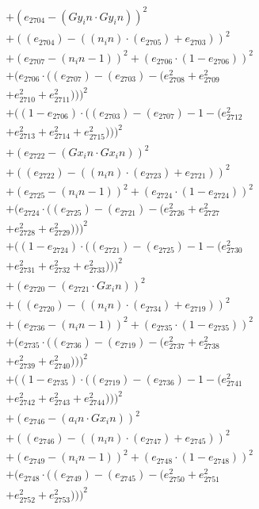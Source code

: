 \documentclass[10pt, a4paper]{article}
\begin{document}
\begin{small}
\begin{align*}
& + (e_{2704} - (Gy_in  \cdot  Gy_in))^{2} \\
& + ((e_{2704}) - ((n_in)  \cdot  (e_{2705}) + e_{2703}))^{2} \\
& + (e_{2707} - (n_in - 1))^{2} + (e_{2706}  \cdot  (1 - e_{2706}))^{2} \\
& + (e_{2706}  \cdot  ((e_{2707}) - (e_{2703}) - (e_{2708}^{2} + e_{2709}^{2} \\
& + e_{2710}^{2} + e_{2711}^{2})))^{2} \\
& + ((1 - e_{2706})  \cdot  ((e_{2703}) - (e_{2707}) - 1 - (e_{2712}^{2} \\
& + e_{2713}^{2} + e_{2714}^{2} + e_{2715}^{2})))^{2} \\
& + (e_{2722} - (Gx_in  \cdot  Gx_in))^{2} \\
& + ((e_{2722}) - ((n_in)  \cdot  (e_{2723}) + e_{2721}))^{2} \\
& + (e_{2725} - (n_in - 1))^{2} + (e_{2724}  \cdot  (1 - e_{2724}))^{2} \\
& + (e_{2724}  \cdot  ((e_{2725}) - (e_{2721}) - (e_{2726}^{2} + e_{2727}^{2} \\
& + e_{2728}^{2} + e_{2729}^{2})))^{2} \\
& + ((1 - e_{2724})  \cdot  ((e_{2721}) - (e_{2725}) - 1 - (e_{2730}^{2} \\
& + e_{2731}^{2} + e_{2732}^{2} + e_{2733}^{2})))^{2} \\
& + (e_{2720} - (e_{2721}  \cdot  Gx_in))^{2} \\
& + ((e_{2720}) - ((n_in)  \cdot  (e_{2734}) + e_{2719}))^{2} \\
& + (e_{2736} - (n_in - 1))^{2} + (e_{2735}  \cdot  (1 - e_{2735}))^{2} \\
& + (e_{2735}  \cdot  ((e_{2736}) - (e_{2719}) - (e_{2737}^{2} + e_{2738}^{2} \\
& + e_{2739}^{2} + e_{2740}^{2})))^{2} \\
& + ((1 - e_{2735})  \cdot  ((e_{2719}) - (e_{2736}) - 1 - (e_{2741}^{2} \\
& + e_{2742}^{2} + e_{2743}^{2} + e_{2744}^{2})))^{2} \\
& + (e_{2746} - (a_in  \cdot  Gx_in))^{2} \\
& + ((e_{2746}) - ((n_in)  \cdot  (e_{2747}) + e_{2745}))^{2} \\
& + (e_{2749} - (n_in - 1))^{2} + (e_{2748}  \cdot  (1 - e_{2748}))^{2} \\
& + (e_{2748}  \cdot  ((e_{2749}) - (e_{2745}) - (e_{2750}^{2} + e_{2751}^{2} \\
& + e_{2752}^{2} + e_{2753}^{2})))^{2} \\

\end{align*}
\end{small}
\end{document}
